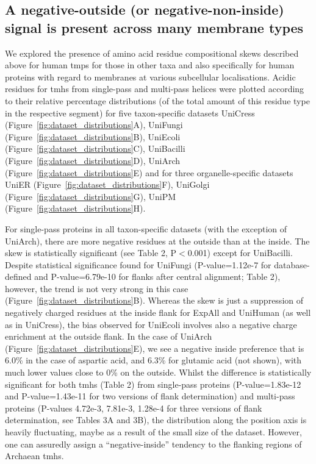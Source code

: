 \subsection{A negative-outside (or negative-non-inside) signal is present across many membrane types}

We explored the presence of amino acid residue compositional skews described above for human \gls{tmp}s for those in other taxa and also specifically for human proteins with regard to membranes at various subcellular localisations. Acidic residues for \gls{tmh}s from single-pass and multi-pass helices were plotted according to their relative percentage distributions (of the total amount of this residue type in the respective segment) for five taxon-specific datasets UniCress (Figure~\ref{fig:dataset_distributions}A), UniFungi (Figure~\ref{fig:dataset_distributions}B), UniEcoli (Figure~\ref{fig:dataset_distributions}C), UniBacilli (Figure~\ref{fig:dataset_distributions}D), UniArch (Figure~\ref{fig:dataset_distributions}E) and for three organelle-specific datasets UniER (Figure~\ref{fig:dataset_distributions}F), UniGolgi (Figure~\ref{fig:dataset_distributions}G), UniPM (Figure~\ref{fig:dataset_distributions}H).

For single-pass proteins in all taxon-specific datasets (with the exception of UniArch), there are more negative residues at the outside than at the inside. The skew is statistically significant (see Table 2, P$<$0.001) except for UniBacilli. Despite statistical significance found for UniFungi (P-value=1.12e-7 for database-defined and P-value=6.79e-10 for flanks after central alignment; Table 2), however, the trend is not very strong in this case (Figure~\ref{fig:dataset_distributions}B). Whereas the skew is just a suppression of negatively charged residues at the inside flank for ExpAll and UniHuman (as well as in UniCress), the bias observed for UniEcoli involves also a negative charge enrichment at the outside flank. In the case of UniArch (Figure~\ref{fig:dataset_distributions}E), we see a negative inside preference that is 6.0\% in the case of aspartic acid, and 6.3\% for glutamic acid (not shown), with much lower values close to 0\% on the outside. Whilst the difference is statistically significant for both \gls{tmh}s (Table 2) from single-pass proteins (P-value=1.83e-12 and P-value=1.43e-11 for two versions of flank determination) and multi-pass proteins (P-values 4.72e-3, 7.81e-3, 1.28e-4 for three versions of flank determination, see Tables 3A and 3B), the distribution along the position axis is heavily fluctuating, maybe as a result of the small size of the dataset. However, one can assuredly assign a “negative-inside” tendency to the flanking regions of Archaean \gls{tmh}s.

